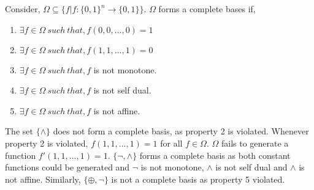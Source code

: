 \begin{theorem} Consider, $\Omega \subseteq \{f|f:\{0,1\} ^n \rightarrow \{0,1\}\}$. $\Omega$ forms a complete bases if, 

\begin{enumerate}
\item{$\exists  f \in \Omega \ such \ that, f(0,0,...,0)=1$}
\item{$\exists  f \in \Omega \ such \ that, f(1,1,...,1)=0$}
\item{$\exists  f \in \Omega \ such \ that,f$ is not monotone.}
\item{$\exists  f \in \Omega \ such \ that,f$ is not self dual.}
\item{$\exists  f \in \Omega \ such \ that,f$ is not affine.}
\end{enumerate}
\end{theorem}

The set $\{\wedge\}$ does not form a complete basis, as property 2 is violated. Whenever property 2 is violated, $f(1,1,...,1)=1$ for all $f \in \Omega$. $\Omega$ fails to generate a function $f'(1,1,...,1)=1$.  $\{\neg,\wedge\}$ forms a complete basis as both constant functions could be generated and $\neg$ is not monotone, $\wedge$ is not self dual and $\wedge$ is not affine. Similarly, $\{\oplus,\neg\}$ is not a complete basis as 
property 5 violated.
